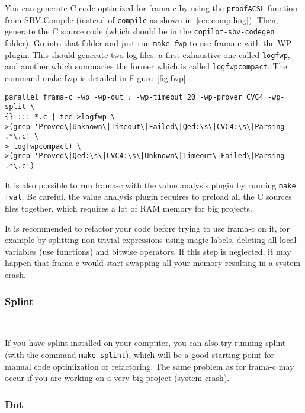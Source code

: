 You can generate C code optimized for frama-c by using the \texttt{proofACSL}
function from SBV.Compile (instead of \texttt{compile} as shown
in~\ref{sec:compiling}). Then, generate the C source code (which should be in
the \texttt{copilot-sbv-codegen} folder). Go into that folder and just run
\texttt{make fwp} to use frama-c with the WP plugin. This should generate two
log files: a first exhaustive one called \texttt{logfwp}, and another which
summaries the former which is called \texttt{logfwpcompact}. The command make
fwp is detailed in Figure~\ref{fig:fwp}.

\begin{figure*}[!htb]
	\begin{lstlisting}[frame=none]
parallel frama-c -wp -wp-out . -wp-timeout 20 -wp-prover CVC4 -wp-split \
{} ::: *.c | tee >logfwp \
>(grep 'Proved\|Unknown\|Timeout\|Failed\|Qed:\s\|CVC4:\s\|Parsing .*\.c' \
> logfwpcompact) \
>(grep 'Proved\|Qed:\s\|CVC4:\s\|Unknown\|Timeout\|Failed\|Parsing .*\.c')

	\end{lstlisting}
	\caption{The bash command.}
	\label{fig:fwp}
\end{figure*}

It is also possible to run frama-c with the value analysis plugin by running
\texttt{make fval}. Be careful, the value analysis plugin requires to preload
all the C sources files together, which requires a lot of RAM memory for big
projects.

It is recommended to refactor your code before trying to use frama-c on it, for
example by splitting non-trivial expressions using magic labels, deleting all
local variables (use functions) and bitwise operators. If this step is
neglected, it may happen that frama-c would start swapping all your memory
resulting in a system crash.

\subsubsection{Splint}~\label{subsec:splint}

If you have splint installed on your computer, you can also try running splint
(with the command \texttt{make splint}), which will be a good starting point
for manual code optimization or refactoring. The same problem as for frama-c
may occur if you are working on a very big project (system crash).

\subsubsection{Dot}~\label{subsec:dot}

